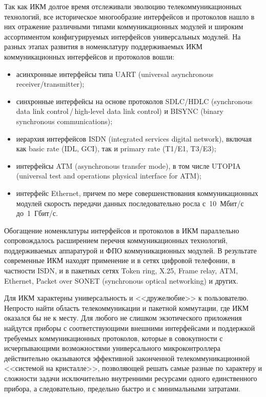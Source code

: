 \begin{multicols}{2}
     Так как ИКМ долгое время отслеживали эволюцию телекоммуникационных 
технологий, все историческое многообразие интерфейсов и протоколов нашло в них 
отражение различными типами коммуникационных модулей и широким ассортиментом 
конфигурируемых интерфейсов универсальных модулей. На разных этапах развития в 
номенклатуру поддерживаемых ИКМ коммуникационных интерфейсов и протоколов вошли:
     \begin{itemize}
\item асинхронные интерфейсы типа UART (universal asynchronous receiver/transmitter);
\item синхронные интерфейсы на основе протоколов SDLC/HDLC (synchronous data link 
control\,/\,high-level data link control) и BISYNC (binary synchronous communications);
\item иерархия интерфейсов ISDN (integrated services digital network), включая как basic rate 
(IDL, GCI), так и primary rate (T1/E1, T3/E3);
\item интерфейсы ATM (asynchronous transfer mode), в том числе UTOPIA (universal test and 
operations physical interface for ATM);
\item интерфейс Ethernet, причем по мере совершенствования коммуникационных модулей 
скорость передачи данных последовательно росла с~10~Мбит/с до~1~Гбит/с.
     \end{itemize}
     
     Обогащение номенклатуры интерфейсов и %
     протоколов в ИКМ параллельно 
сопровождалось расши\-ре\-ни\-ем перечня коммуникационных технологий, поддерживаемых 
аппаратурой и ФПО коммуникационных модулей. В результате современные ИКМ находят 
применение и в сетях цифровой телефонии, в частности ISDN, и в пакетных сетях Token 
ring, X.25, Frame relay, ATM, Ethernet, Packet over SONET (synchronous optical networking) и 
других.

     
     Для ИКМ характерны универсальность и <<дружелюбие>> к пользователю. Непросто 
найти область телекоммуникации и пакетной коммутации, где ИКМ оказался бы не к месту. 
Для любого не слишком экзотического приложения найдутся приборы с соответствующими 
внешними интерфейсами и %
поддержкой требуемых коммуникационных протоколов, которые 
в совокупности с ис\-чер\-пы\-ва\-ющи\-ми возможностями универсального мик\-ро\-кон\-т\-рол\-ле\-ра 
действительно оказываются эффективной %
закон\-чен\-ной телекоммуникационной <<систе\-мой 
на кристалле>>, позволяющей решать самые разные по характеру и сложности задачи 
исключительно внут\-рен\-ни\-ми ресурсами одного единственного прибора, а следовательно, 
предельно быст\-ро и с минимальными затратами.
     

\end{multicols}
